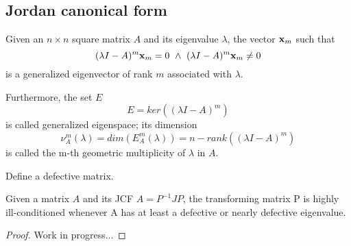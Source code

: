 \subsection*{Jordan canonical form}
\begin{definition}
    Given an \(n \times n\) square matrix \(A\) and its eigenvalue \(\lambda\), the vector \(\vb{x}_{m}\) such that
    \[
        (\lambda I - A)^{m} \vb{x}_{m} = 0 \ \wedge \ (\lambda I - A)^{m} \vb{x}_{m} \neq 0
    \]
    is a generalized eigenvector of rank \(m\) associated with \(\lambda\).

    Furthermore, the set \(E\)
    \[
        E = ker((\lambda I - A)^m)
    \]
    is called generalized eigenspace;
    its dimension
    \[
        \nu_{A}^{m}(\lambda) = dim(E_{A}^{m}(\lambda)) = n - rank((\lambda I - A)^m)
    \]
    is called the m-th geometric multiplicity of \(\lambda\) in \(A\).
\end{definition}
\begin{example}
    Define a defective matrix.
\end{example}
\begin{definition}
    
\end{definition}
\begin{theorem}
    Given a matrix \(A\) and its JCF \(A = P^{-1}JP\), the transforming matrix P is highly ill-conditioned
    whenever A has at least a defective or nearly defective eigenvalue.
\end{theorem}
\begin{proof}
    Work in progress...
\end{proof}
